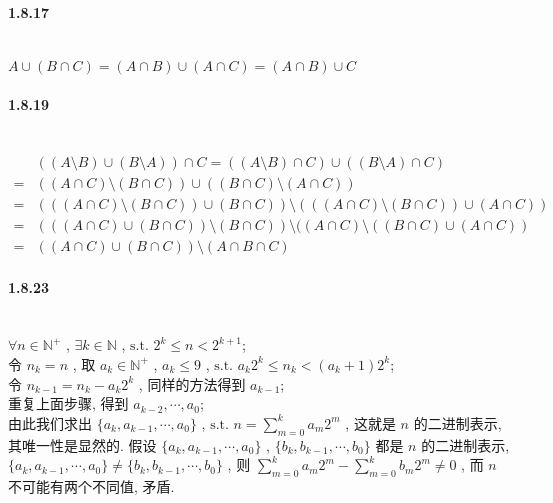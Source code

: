 \documentclass[a4paper, UTF8]{ctexart}				%
\numberwithin{equation}{section}				%
\begin{document}
    \paragraph{1.8.17}\quad\\
        $A \cup (B \cap C) = (A \cap B) \cup (A \cap C) = (A \cap B) \cup C$
    \paragraph{1.8.19}\quad\\
        \begin{equation*}
            \begin{split}
                &((A \setminus B) \cup (B \setminus A)) \cap C = ((A \setminus B) \cap C) \cup ((B \setminus A) \cap C)\\
                = & ((A \cap C) \setminus (B \cap C)) \cup ((B \cap C) \setminus (A \cap C))\\
                = & (((A \cap C) \setminus (B \cap C)) \cup (B \cap C)) \setminus (((A \cap C) \setminus (B \cap C)) \cup (A \cap C))\\
                = & (((A \cap C) \cup (B \cap C)) \setminus (B \cap C)) \setminus ((A \cap C) \setminus ((B \cap C) \cup (A \cap C))\\
                = & ((A \cap C) \cup (B \cap C)) \setminus (A \cap B \cap C)
            \end{split}
        \end{equation*}
    \paragraph{1.8.23}\quad\\
        $\forall n \in \mathbb{N}^+$ , $\exists k \in \mathbb{N}$ , $\text{s.t. } 2^k \le n < 2^{k + 1}$;\\
        令 $n_k = n$ , 取 $a_k \in \mathbb{N}^+$ , $a_k \le 9$ , $\text{s.t. } a_k 2^k \le n_k < (a_k + 1)2^k$;\\
        令 $n_{k - 1} = n_k - a_k2^k$ , 同样的方法得到 $a_{k - 1}$;\\
        重复上面步骤, 得到 $a_{k-2}, \cdots , a_0$;\\
        由此我们求出 $\{a_k, a_{k-1}, \cdots, a_0\}$ , $\text{s.t. } n = \sum^{k}_{m=0} a_m 2^m$ , 这就是 $n$ 的二进制表示, 其唯一性是显然的. 假设 $\{a_k, a_{k-1}, \cdots, a_0\}$ , $\{b_k, b_{k-1}, \cdots, b_0\}$ 都是 $n$ 的二进制表示, $\{a_k, a_{k-1}, \cdots, a_0\} \neq \{b_k, b_{k-1}, \cdots, b_0\}$ , 则 $\sum^{k}_{m=0} a_m 2^m - \sum^{k}_{m=0} b_m 2^m \neq 0$ , 而 $n$ 不可能有两个不同值, 矛盾.
\end{document}
